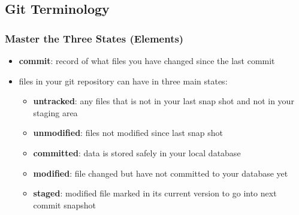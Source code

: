 \documentclass[12pt]{beamer}
\begin{document}
\subsection{Git Terminology}
\begin{frame}
\frametitle{Master the Three States (Elements)}
\begin{itemize}
	\item \textbf{commit}: record of what files you have changed since the last commit
	\item files in your git repository can have in three main states:
	\begin{itemize}
		\item \textbf{untracked}: any files that is not in your last snap shot and not in your staging area
		\item \textbf{unmodified}: files not modified since last snap shot
		\item \textbf{committed}: data is stored safely in your local database
		\item \textbf{modified}: file changed but have not committed to your database yet
		\item \textbf{staged}: modified file marked in its current version to go into next commit snapshot 
	\end{itemize}
\end{itemize}
\end{frame}
\end{document}
